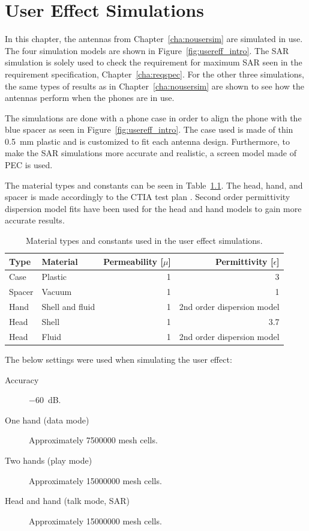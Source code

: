 \chapter{User Effect Simulations}
\label{cha:usereff}
In this chapter, the antennas from Chapter~\ref{cha:nousersim} are simulated in use.
The four simulation models are shown in Figure~\ref{fig:usereff_intro}. The SAR simulation is solely used to check the requirement for maximum SAR seen in the requirement specification, Chapter~\ref{cha:reqspec}. For the other three simulations, the same types of results as in Chapter~\ref{cha:nousersim} are shown to see how the antennas perform when the phones are in use.

The simulations are done with a phone case in order to align the phone with the blue spacer as seen in Figure~\ref{fig:usereff_intro}. The case used is made of thin \SI{0.5}{mm} plastic and is customized to fit each antenna design. Furthermore, to make the SAR simulations more accurate and realistic, a screen model made of PEC is used.

The material types and constants can be seen in Table~\ref{tab:cst_material}. The head, hand, and spacer is made accordingly to the CTIA test plan \cite{cita2015}. Second order permittivity dispersion model fits have been used for the head and hand models to gain more accurate results.

\begin{table}
  \centering
  \begin{tabular}{|l|l|r|r|}
    \hline
    Type & Material & Permeability [$\mu$] & Permittivity [$\epsilon$] \\
    \hline
    Case      & Plastic  & 1    & 3       \\
    Spacer    & Vacuum   & 1    & 1       \\
    Hand      & Shell and fluid   & 1    & 2nd order dispersion model    \\
    Head      & Shell    & 1    & 3.7     \\
    Head      & Fluid    & 1    & 2nd order dispersion model     \\ 
    \hline
  \end{tabular}
  \caption{Material types and constants used in the user effect simulations.}
  \label{tab:cst_material}
\end{table}

The below settings were used when simulating the user effect:
\begin{description}
\item[Accuracy] \SI{-60}{dB}.
\item[One hand (data mode)] Approximately \num{7500000} mesh cells.
\item[Two hands (play mode)] Approximately \num{15000000} mesh cells.
\item[Head and hand (talk mode, SAR)] Approximately \num{15000000} mesh cells.
\end{description}



